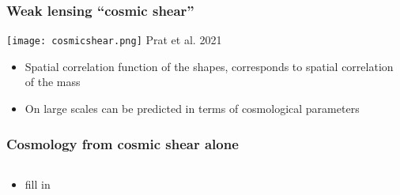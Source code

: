 \documentclass{beamer}
\begin{document}
\frame
{
    \frametitle{Weak lensing ``cosmic shear''}


    \begin{center}
        \texttt{[image: cosmicshear.png]}
        {\tiny Prat et al. 2021}
    \end{center}

    \begin{itemize}

        \item Spatial correlation function of the shapes, corresponds to
            spatial correlation of the mass

        \item On large scales can be predicted in terms of cosmological
            parameters

    \end{itemize}

}

\frame
{
    \frametitle{Cosmology from cosmic shear alone}


    \begin{columns}
        \begin{column}{0.5\textwidth}    
            \begin{itemize}

                \item fill in

            \end{itemize}
        \end{column}
        \begin{column}{0.5\textwidth}
        \end{column}
    \end{columns}

}
\end{document}
